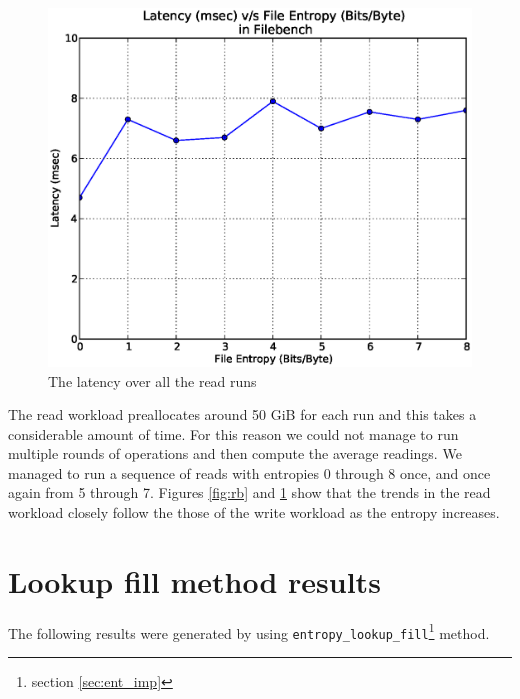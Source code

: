 \begin{figure}[H]
\begin{center}
\includegraphics[scale=.55]{../results/set1/read_latency.eps}
\caption{The latency over all the read runs}
\label{fig:rl}
\end{center}
\end{figure}

\noindent The read workload preallocates around 50 GiB for each run and this takes a considerable amount of time. For this reason we could not manage to run multiple rounds of operations and then compute the average readings. We managed to run a sequence of reads with entropies 0 through 8 once, and once again from 5 through 7. Figures \ref{fig:rb} and \ref{fig:rl} show that the trends in the read workload closely follow the those of the write workload as the entropy increases.

\section{Lookup fill method results}
The following results were generated by using \verb+entropy_lookup_fill+\footnote{section \ref{sec:ent_imp}} method.


